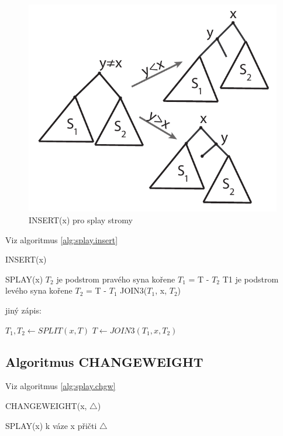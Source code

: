 \begin{figure}[!htb]
\centering\includegraphics{pics/splay-insert}
\caption{INSERT(x) pro splay stromy}
\label{splay-insert}
\end{figure}


Viz algoritmus \ref{alg:splay.insert}

\begin{algorithm}[!htb]
\caption{INSERT(x)}
\label{alg:splay.insert}
\begin{algorithmic}
\STATE SPLAY(x)
          \STATE $T_2$ je podstrom pravého syna kořene
               \STATE $T_1$ = T - $T_2$ 
	  \ELSE 
	       \STATE T1 je podstrom levého syna kořene
	       \STATE $T_2$ = T - $T_1$
       \ENDIF
       \STATE JOIN3($T_1$, x, $T_2$)
\ENDIF
\end{algorithmic}
\end{algorithm}

jiný zápis:
\begin{algorithmic}
\STATE $T_1, T_2 \leftarrow SPLIT(x, T)$
\STATE $T \leftarrow JOIN3(T_1, x, T_2)$
\end{algorithmic}

\subsection{Algoritmus CHANGEWEIGHT}

Viz algoritmus \ref{alg:splay.chgw}

\begin{algorithm}[!htb]
\caption{CHANGEWEIGHT(x, $\triangle$)}
\label{alg:splay.chgw}

\begin{algorithmic}
\STATE SPLAY(x)
	\STATE k váze x přičti $\triangle$
\ENDIF
\end{algorithmic}
\end{algorithm}

